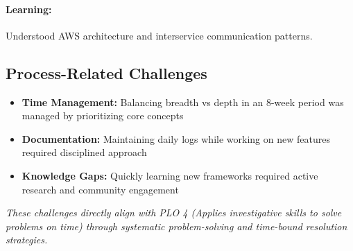 \paragraph{Learning:} Understood AWS architecture and interservice communication patterns.

\subsection{Process-Related Challenges}

\begin{itemize}
    \item \textbf{Time Management:} Balancing breadth vs depth in an 8-week period was managed by prioritizing core concepts
    \item \textbf{Documentation:} Maintaining daily logs while working on new features required disciplined approach
    \item \textbf{Knowledge Gaps:} Quickly learning new frameworks required active research and community engagement
\end{itemize}

\textit{These challenges directly align with PLO 4 (Applies investigative skills to solve problems on time) through systematic problem-solving and time-bound resolution strategies.}
